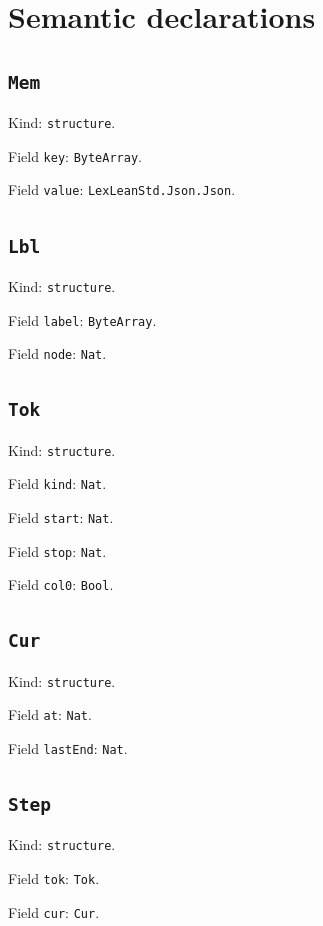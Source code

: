 \documentclass[11pt]{article}
\begin{document}
\section*{Semantic declarations}
\subsection*{\texttt{Mem}}
\noindent Kind: \texttt{structure}.\par
\noindent Field \texttt{key}: \texttt{ByteArray}.\par
\noindent Field \texttt{value}: \texttt{LexLeanStd.Json.Json}.\par
\subsection*{\texttt{Lbl}}
\noindent Kind: \texttt{structure}.\par
\noindent Field \texttt{label}: \texttt{ByteArray}.\par
\noindent Field \texttt{node}: \texttt{Nat}.\par
\subsection*{\texttt{Tok}}
\noindent Kind: \texttt{structure}.\par
\noindent Field \texttt{kind}: \texttt{Nat}.\par
\noindent Field \texttt{start}: \texttt{Nat}.\par
\noindent Field \texttt{stop}: \texttt{Nat}.\par
\noindent Field \texttt{col0}: \texttt{Bool}.\par
\subsection*{\texttt{Cur}}
\noindent Kind: \texttt{structure}.\par
\noindent Field \texttt{at}: \texttt{Nat}.\par
\noindent Field \texttt{lastEnd}: \texttt{Nat}.\par
\subsection*{\texttt{Step}}
\noindent Kind: \texttt{structure}.\par
\noindent Field \texttt{tok}: \texttt{Tok}.\par
\noindent Field \texttt{cur}: \texttt{Cur}.\par
\end{document}
